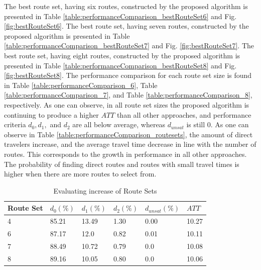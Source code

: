 The best route set, having six routes, constructed by the proposed algorithm is presented in Table \vref{table:performanceComparison_bestRouteSet6} and Fig. \vref{fig:bestRouteSet6}. The best route set, having seven routes, constructed by the proposed algorithm is presented in Table \vref{table:performanceComparison_bestRouteSet7} and Fig. \vref{fig:bestRouteSet7}. The best route set, having eight routes, constructed by the proposed algorithm is presented in Table \vref{table:performanceComparison_bestRouteSet8} and Fig. \vref{fig:bestRouteSet8}. The performance comparison for each route set size is found in Table \vref{table:performanceComparison_6}, Table \vref{table:performanceComparison_7}, and Table \vref{table:performanceComparison_8}, respectively. As one can observe, in all route set sizes the proposed algorithm is continuing to produce a higher $ATT$ than all other approaches, and performance criteria $d_0, d_1,$ and $d_{2}$ are all below average, whereas $d_{unsat}$ is still 0. As one can observe in Table \vref{table:performanceComparison_routesets}, the amount of direct travelers increase, and the average travel time decrease in line with the number of routes. This corresponds to the growth in performance in all other approaches. The probability of finding direct routes and routes with small travel times is higher when there are more routes to select from. 

 \begin{table}[H]
    \centering
    \begin{tabular}{|l||l|l|l|l|l|}
    \hline
    Route Set & $d_0(\%)$ & $d_1(\%)$ & $d_2(\%)$ & $d_{unsat}(\%)$ & $ATT$ \\
    \hline
    4 & 85.21 & 13.49 & 1.30 & 0.00 & 10.27\\
    6 & 87.17 & 12.0 & 0.82 & 0.01 & 10.11\\
    7 & 88.49 & 10.72 & 0.79 & 0.0 & 10.08\\
    8 & 89.16 & 10.05 & 0.80 & 0.0 & 10.06\\
    \hline
    \end{tabular}
    \caption {Evaluating increase of Route Sets}
    \label{table:performanceComparison_routesets}
\end{table}

